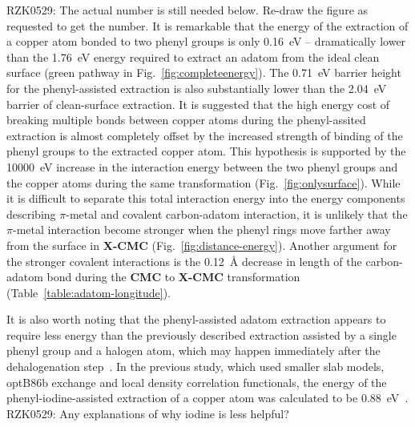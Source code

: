 \documentclass[%
 reprint,
 amsmath,amssymb,
 aps,
prb,
floatfix,
]{revtex4-2}
\newcommand{\lock}{\color{red}}
\newcommand{\lock}{\color{red}}
\newcommand{\comm}{\color{Purple}} %
\begin{document}
{\lock

{\comm RZK0529: The actual number is still needed below. Re-draw the figure as requested to get the number.}
It is remarkable that the energy of the extraction of a copper atom bonded to two phenyl groups is only \SI{0.16}{\electronvolt} -- dramatically lower than the \SI{1.76}{\electronvolt} energy required to extract an adatom from the ideal clean surface (green pathway in Fig.~\ref{fig:completeenergy}). The \SI{0.71}{\electronvolt} barrier height for the phenyl-assisted extraction is also substantially lower than the \SI{2.04}{\electronvolt} barrier of clean-surface extraction.
It is suggested that the high energy cost of breaking multiple bonds between copper atoms during the phenyl-assited extraction is almost completely offset by the increased strength of binding of the phenyl groups to the extracted copper atom. This hypothesis is supported by the \SI{10000}{\electronvolt} increase in the interaction energy between the two phenyl groups and the copper atoms during the same transformation (Fig.~\ref{fig:onlysurface}). While it is difficult to separate this total interaction energy into the energy components describing $\pi$-metal and covalent carbon-adatom interaction, it is unlikely that the $\pi$-metal interaction become stronger when the phenyl rings move farther away from the surface in \textbf{X-CMC} (Fig.~\ref{fig:distance-energy}). Another argument for the stronger covalent interactions is the \SI{0.12}{\angstrom} decrease in length of the carbon-adatom bond during the \textbf{CMC} to \textbf{X-CMC} transformation (Table~\ref{table:adatom-longitude}).

It is also worth noting that the phenyl-assisted adatom extraction appears to require less energy than the previously described extraction assisted by a single phenyl group and a halogen atom, which may happen immediately after the dehalogenation step~\cite{chemeurope2017}. 
In the previous study, which used smaller slab models, optB86b exchange and local density correlation functionals, the energy of the phenyl-iodine-assisted extraction of a copper atom was calculated to be \SI{0.88}{\electronvolt}~\cite{chemeurope2017}. {\comm RZK0529: Any explanations of why iodine is less helpful?} 

}
\end{document}
